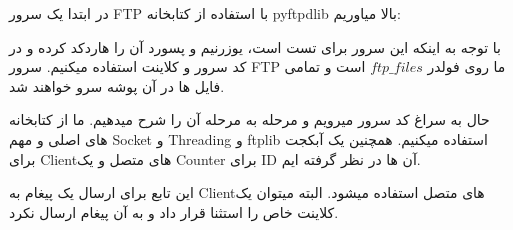 
در ابتدا یک سرور FTP با استفاده از کتابخانه pyftpdlib بالا میاوریم:


	{
	}

با توجه به اینکه این سرور برای تست است، یوزرنیم و پسورد آن را هاردکد کرده و در کد سرور و کلاینت استفاده میکنیم. سرور FTP ما روی فولدر $ftp\_files$ است و تمامی فایل ها در آن پوشه سرو خواهند شد.


حال به سراغ کد سرور میرویم و مرحله به مرحله آن را شرح میدهیم.
ما از کتابخانه های اصلی و مهم Socket و Threading و ftplib استفاده میکنیم. همچنین یک آبکجت برای Clientهای متصل و یک Counter برای ID آن ها در نظر گرفته ایم. 

{
}

\pagebreak

این تابع برای ارسال یک پیغام به Clientهای متصل استفاده میشود. البته میتوان یک کلاینت خاص را استثنا قرار داد و به آن پیغام ارسال نکرد.

{
}


